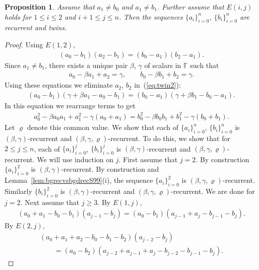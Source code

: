 \documentclass[pdftex]{sigma}
\numberwithin{equation}{section}
\newtheorem{Proposition}[Theorem]{Proposition}
\begin{document}
\begin{Proposition}\label{prop:hr}
Assume that $a_1 \not=b_0$ and $a_1 \not=b_1$.
Further assume that
$E(i,j)$ holds
for $1 \leq i \leq 2$ and $i+1\leq j\leq n$. Then
the sequences $\lbrace a_i \rbrace_{i=0}^n$,
$\lbrace b_i \rbrace_{i=0}^n$ are recurrent and twins.
\end{Proposition}
\begin{proof}Using $E(1,2)$,
\begin{gather}\label{eq:twin2}
(a_0-b_1)(a_2-b_1)=
(b_0-a_1)(b_2-a_1).
\end{gather}
Since $a_1 \not=b_1$, there exists a unique pair
$\beta$, $\gamma$ of scalars in $\mathbb F$
such that
\begin{gather*}
a_0 - \beta a_1 + a_2 = \gamma,
\qquad
b_0 - \beta b_1 + b_2 = \gamma.
\end{gather*}
Using these equations we eliminate $a_2$, $b_2$ in~(\ref{eq:twin2}):
\begin{gather*}
(a_0-b_1)(\gamma + \beta a_1-a_0-b_1) =
(b_0-a_1)(\gamma + \beta b_1-b_0-a_1).
\end{gather*}
In this equation we rearrange terms to get
\begin{gather*}
a^2_{0}-\beta a_{0}a_1 + a^2_1 - \gamma (a_{0}+a_1) =
b^2_{0}-\beta b_{0}b_1 + b^2_1 - \gamma (b_{0}+b_1).
\end{gather*}
Let $\varrho$ denote this common value.
We show that each of
$\lbrace a_i \rbrace_{i=0}^n$,
$\lbrace b_i \rbrace_{i=0}^n$ is
 $(\beta, \gamma)$-recurrent
and $(\beta, \gamma,\varrho)$-recurrent.
To do this, we show that for $2\leq j \leq n$, each of
$\lbrace a_i \rbrace_{i=0}^j$,
$\lbrace b_i \rbrace_{i=0}^j$ is
 $(\beta, \gamma)$-recurrent
and $(\beta, \gamma,\varrho)$-recurrent.
We will use induction on $j$.
First assume that $j=2$. By construction
$\lbrace a_i \rbrace_{i=0}^2$ is $(\beta, \gamma)$-recurrent.
By construction
and Lemma~\ref{lem:bgrecvsbgdrecS99}(i), the sequence
$\lbrace a_i \rbrace_{i=0}^2$ is $(\beta, \gamma,\varrho)$-recurrent.
Similarly $\lbrace b_i \rbrace_{i=0}^2$ is $(\beta, \gamma)$-recurrent and
$(\beta, \gamma,\varrho)$-recurrent.
We are done for $j=2$.
Next assume that $j\geq 3$.
By $E(1,j)$,
\begin{align}
(a_0+a_1-b_0-b_1)(a_{j-1}-b_j)=
(a_0-b_1)(a_{j-1}+a_j-b_{j-1}-b_j).
\label{eq:E1n}
\end{align}
By $E(2,j)$,
\begin{gather}
(a_0+a_1+a_2-b_0-b_1-b_2)(a_{j-2}-b_j)\nonumber\\
\qquad{} =(a_0-b_2)(a_{j-2}+a_{j-1}+a_j-b_{j-2}-b_{j-1}-b_j).\label{eq:E2n}

\end{gather}
\end{proof}
\end{document}
